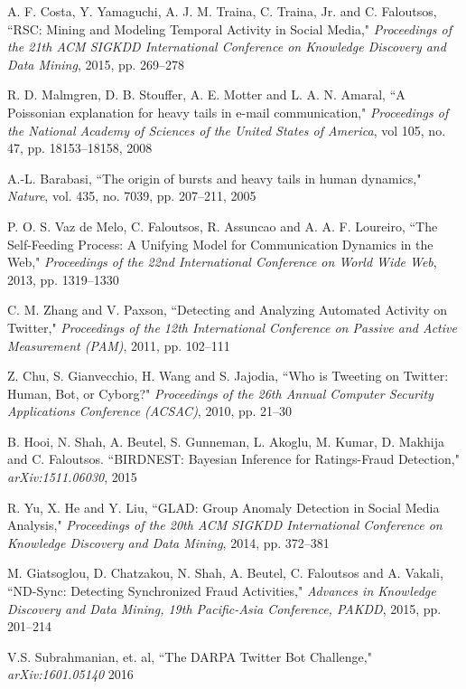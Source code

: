 \documentclass[11pt, oneside]{article}   	%
\begin{document}
\begin{thebibliography}{123}

 A. F. Costa, Y. Yamaguchi, A. J. M. Traina, C. Traina, Jr. and C. Faloutsos, ``RSC: Mining and Modeling Temporal Activity in Social Media," \emph{Proceedings of the 21th ACM SIGKDD International Conference on Knowledge Discovery and Data Mining}, 2015, pp. 269--278

 R. D. Malmgren, D. B. Stouffer, A. E. Motter and L. A. N. Amaral, ``A Poissonian explanation for heavy tails in e-mail communication," \emph{Proceedings of the National Academy of Sciences of the United States of America}, vol 105, no. 47, pp. 18153--18158, 2008

 A.-L. Barabasi, ``The origin of bursts and heavy tails in human dynamics," \emph{Nature}, vol. 435, no. 7039, pp. 207--211, 2005

 P. O. S. Vaz de Melo, C. Faloutsos, R. Assuncao and A. A. F. Loureiro, ``The Self-Feeding Process: A Unifying Model for Communication Dynamics in the Web," \emph{Proceedings of the 22nd International Conference on World Wide Web}, 2013, pp. 1319--1330 

 C. M. Zhang and V. Paxson, ``Detecting and Analyzing Automated Activity on Twitter," \emph{Proceedings of the 12th International Conference on Passive and Active Measurement (PAM)}, 2011, pp. 102--111 

 Z. Chu, S. Gianvecchio, H. Wang and S. Jajodia, ``Who is Tweeting on Twitter: Human, Bot, or Cyborg?" \emph{Proceedings of the 26th Annual Computer Security Applications Conference (ACSAC)}, 2010, pp. 21--30  

 B. Hooi, N. Shah, A. Beutel, S. Gunneman, L. Akoglu, M. Kumar, D. Makhija and C. Faloutsos. ``BIRDNEST: Bayesian Inference for Ratings-Fraud Detection," \emph{arXiv:1511.06030}, 2015

 R. Yu, X. He and Y. Liu, ``GLAD: Group Anomaly Detection in Social Media Analysis," \emph{Proceedings of the 20th ACM SIGKDD International Conference on Knowledge Discovery and Data Mining}, 2014, pp. 372--381

 M. Giatsoglou, D. Chatzakou, N. Shah, A. Beutel, C. Faloutsos and A. Vakali, ``ND-Sync: Detecting Synchronized Fraud Activities," \emph{Advances in Knowledge Discovery and Data Mining, 19th Pacific-Asia Conference, PAKDD}, 2015, pp. 201--214

 V.S. Subrahmanian, et. al, ``The DARPA Twitter Bot Challenge," \emph{arXiv:1601.05140} 2016


\end{thebibliography}
\end{document}
